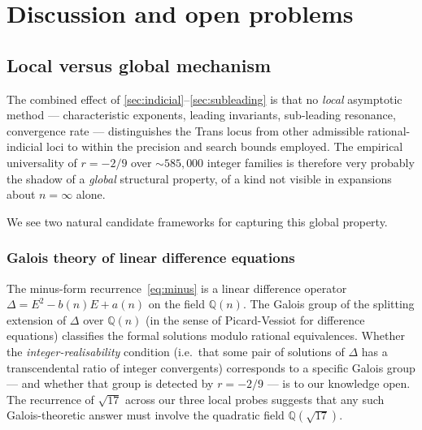 \documentclass[11pt]{amsart}
\theoremstyle{definition}
\theoremstyle{remark}
\newcommand{\Q}{\mathbb{Q}}
\begin{document}
\section{Discussion and open problems}\label{sec:discussion}

\subsection{Local versus global mechanism}

The combined effect of \textsection\textsection\ref{sec:indicial}--\ref{sec:subleading}
is that no \emph{local} asymptotic method --- characteristic
exponents, leading invariants, sub-leading resonance, convergence
rate --- distinguishes the Trans locus from other admissible
rational-indicial loci to within the precision and search bounds
employed.  The empirical universality of $r=-2/9$ over
$\sim\!585{,}000$ integer families is therefore very probably the
shadow of a \emph{global} structural property, of a kind not visible
in expansions about $n=\infty$ alone.

We see two natural candidate frameworks for capturing this global
property.

\subsubsection{Galois theory of linear difference equations}
The minus-form recurrence~\eqref{eq:minus} is a linear difference
operator $\Delta = E^2 - b(n) E + a(n)$ on the field $\Q(n)$.  The
Galois group of the splitting extension of $\Delta$ over $\Q(n)$
(in the sense of Picard-Vessiot for difference equations) classifies
the formal solutions modulo rational equivalences.  Whether the
\emph{integer-realisability} condition (i.e.\ that some pair of
solutions of $\Delta$ has a transcendental ratio of integer
convergents) corresponds to a specific Galois group --- and whether
that group is detected by $r=-2/9$ --- is to our knowledge open.
The recurrence of $\sqrt{17}$ across our three local probes
suggests that any such Galois-theoretic answer must involve the
quadratic field $\Q(\sqrt{17})$.
\end{document}
